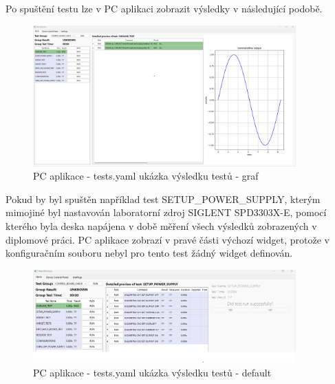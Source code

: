 Po spuštění testu lze v PC aplikaci zobrazit výsledky v následující podobě.
\begin{figure}[ht!]
    \centering
    \includegraphics[width = 0.9\textwidth]{obrazky/test_result_widget_graph.png}
    \caption{PC aplikace - tests.yaml ukázka výsledku testů - graf}
    \label{fig: tests yaml graf}
\end{figure}

Pokud by byl spuštěn například test SETUP\_POWER\_SUPPLY, kterým mimojiné byl nastavován laboratorní 
zdroj SIGLENT SPD3303X-E, pomocí kterého byla deska napájena v době měření všech výsledků zobrazených v diplomové práci.
PC aplikace zobrazí v pravé části výchozí widget, protože v konfiguračním souboru nebyl pro tento test žádný widget definován.
\begin{figure}[ht!]
    \centering
    \includegraphics[width = 0.9\textwidth]{obrazky/test_result_widget_prompt.png}
    \caption{PC aplikace - tests.yaml ukázka výsledku testů - default}
    \label{fig: tests yaml default}
\end{figure}


